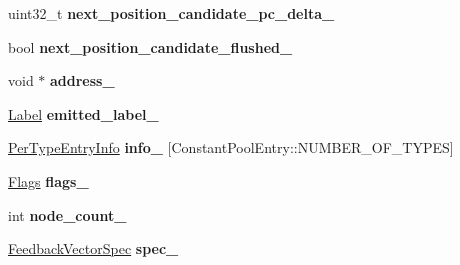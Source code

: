 \begin{DoxyCompactItemize}
\item 
uint32\+\_\+t {\bfseries next\+\_\+position\+\_\+candidate\+\_\+pc\+\_\+delta\+\_\+}\hypertarget{classv8_1_1internal_1_1_b_a_s_e___e_m_b_e_d_d_e_d_aadb26471abc30d6b97a692be4ab69dd3}{}\label{classv8_1_1internal_1_1_b_a_s_e___e_m_b_e_d_d_e_d_aadb26471abc30d6b97a692be4ab69dd3}

\item 
bool {\bfseries next\+\_\+position\+\_\+candidate\+\_\+flushed\+\_\+}\hypertarget{classv8_1_1internal_1_1_b_a_s_e___e_m_b_e_d_d_e_d_a82ae83ae757f40cd7961a5fca2cc248d}{}\label{classv8_1_1internal_1_1_b_a_s_e___e_m_b_e_d_d_e_d_a82ae83ae757f40cd7961a5fca2cc248d}

\item 
void $\ast$ {\bfseries address\+\_\+}\hypertarget{classv8_1_1internal_1_1_b_a_s_e___e_m_b_e_d_d_e_d_a1ba1c5a05d76d707bfe1f73d11a13a71}{}\label{classv8_1_1internal_1_1_b_a_s_e___e_m_b_e_d_d_e_d_a1ba1c5a05d76d707bfe1f73d11a13a71}

\item 
\hyperlink{classv8_1_1internal_1_1_label}{Label} {\bfseries emitted\+\_\+label\+\_\+}\hypertarget{classv8_1_1internal_1_1_b_a_s_e___e_m_b_e_d_d_e_d_a7a52c7ad612251feaabd510e9336becc}{}\label{classv8_1_1internal_1_1_b_a_s_e___e_m_b_e_d_d_e_d_a7a52c7ad612251feaabd510e9336becc}

\item 
\hyperlink{structv8_1_1internal_1_1_b_a_s_e___e_m_b_e_d_d_e_d_1_1_per_type_entry_info}{Per\+Type\+Entry\+Info} {\bfseries info\+\_\+} \mbox{[}Constant\+Pool\+Entry\+::\+N\+U\+M\+B\+E\+R\+\_\+\+O\+F\+\_\+\+T\+Y\+P\+ES\mbox{]}\hypertarget{classv8_1_1internal_1_1_b_a_s_e___e_m_b_e_d_d_e_d_a024e2bc8327e33489483d4ff550a233c}{}\label{classv8_1_1internal_1_1_b_a_s_e___e_m_b_e_d_d_e_d_a024e2bc8327e33489483d4ff550a233c}

\item 
\hyperlink{classv8_1_1base_1_1_flags}{Flags} {\bfseries flags\+\_\+}\hypertarget{classv8_1_1internal_1_1_b_a_s_e___e_m_b_e_d_d_e_d_a3a8e06d7342dd79290ac7f43dc81c577}{}\label{classv8_1_1internal_1_1_b_a_s_e___e_m_b_e_d_d_e_d_a3a8e06d7342dd79290ac7f43dc81c577}

\item 
int {\bfseries node\+\_\+count\+\_\+}\hypertarget{classv8_1_1internal_1_1_b_a_s_e___e_m_b_e_d_d_e_d_a913d9a18bb22398f0193076c812b8327}{}\label{classv8_1_1internal_1_1_b_a_s_e___e_m_b_e_d_d_e_d_a913d9a18bb22398f0193076c812b8327}

\item 
\hyperlink{classv8_1_1internal_1_1_feedback_vector_spec}{Feedback\+Vector\+Spec} {\bfseries spec\+\_\+}\hypertarget{classv8_1_1internal_1_1_b_a_s_e___e_m_b_e_d_d_e_d_ac0faf9366c3b2b61642fed880af20220}{}\label{classv8_1_1internal_1_1_b_a_s_e___e_m_b_e_d_d_e_d_ac0faf9366c3b2b61642fed880af20220}


\end{DoxyCompactItemize}
